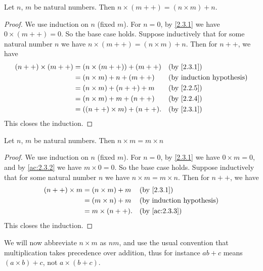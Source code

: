 \begin{ac}\label{ac:2.3.3}
  Let \(n\), \(m\) be natural numbers.
  Then \(n \times (m++) = (n \times m) + n\).
\end{ac}

\begin{proof}
  We use induction on \(n\) (fixed \(m\)).
  For \(n = 0\), by \cref{2.3.1} we have \(0 \times (m++) = 0\).
  So the base case holds.
  Suppose inductively that for some natural number \(n\) we have \(n \times (m++) = (n \times m) + n\).
  Then for \(n++\), we have
  \begin{align*}
    (n++) \times (m++)
     & = (n \times (m++)) + (m++)  &  & \text{(by \cref{2.3.1})}         \\
     & = (n \times m) + n + (m++)  &  & \text{(by induction hypothesis)} \\
     & = (n \times m) + (n++) + m  &  & \text{(by \cref{2.2.5})}         \\
     & = (n \times m) + m + (n++)  &  & \text{(by \cref{2.2.4})}         \\
     & = ((n++) \times m) + (n++). &  & \text{(by \cref{2.3.1})}
  \end{align*}
  This closes the induction.
\end{proof}

\begin{lem}\label{2.3.2}
  Let \(n\), \(m\) be natural numbers.
  Then \(n \times m = m \times n\)
\end{lem}

\begin{proof}
  We use induction on \(n\) (fixed \(m\)).
  For \(n = 0\), by \cref{2.3.1} we have \(0 \times m = 0\), and by \cref{ac:2.3.2} we have \(m \times 0 = 0\).
  So the base case holds.
  Suppose inductively that for some natural number \(n\) we have \(n \times m = m \times n\).
  Then for \(n++\), we have
  \begin{align*}
    (n++) \times m & = (n \times m) + m &  & \text{(by \cref{2.3.1})}         \\
                   & = (m \times n) + m &  & \text{(by induction hypothesis)} \\
                   & = m \times (n++).  &  & \text{(by \cref{ac:2.3.3})}
  \end{align*}
  This closes the induction.
\end{proof}

\begin{note}
  We will now abbreviate \(n \times m\) as \(nm\), and use the usual convention that multiplication takes precedence over addition, thus for instance \(ab + c\) means \((a \times b) + c\), not \(a \times (b + c)\).
\end{note}

